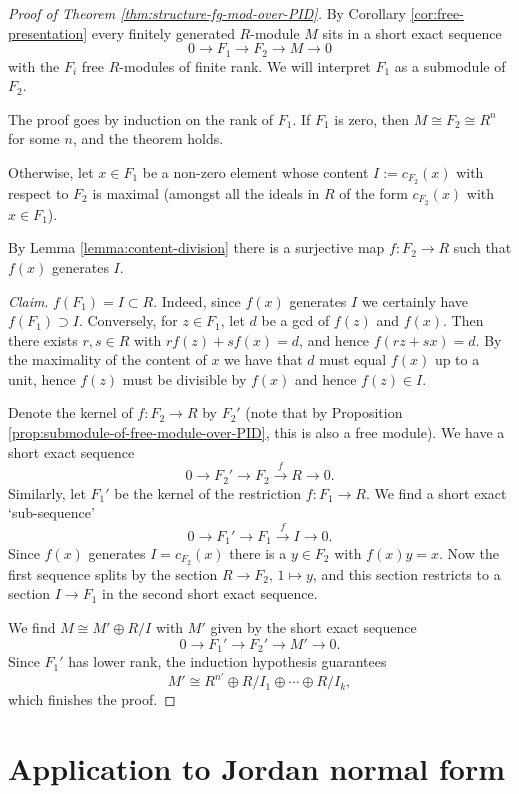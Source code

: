 \documentclass[11pt]{amsbook}
\newcommand{\longto}{\longrightarrow}
\theoremstyle{plain}
\theoremstyle{definition}
\begin{document}
\begin{proof}[Proof of Theorem \ref{thm:structure-fg-mod-over-PID}]
By Corollary \ref{cor:free-presentation} every finitely generated $R$-module $M$ sits in a short exact sequence
\[
	0 \longto F_1 \longto F_2 \longto M \longto 0
\]
with the $F_i$ free $R$-modules of finite rank. We will interpret $F_1$ as a submodule of $F_2$.

The proof goes by induction on the rank of $F_1$. If $F_1$ is zero, then $M\cong F_2\cong R^n$ for some $n$, and the theorem holds.

Otherwise, let  $x\in F_1$  be a non-zero element whose content $I := c_{F_2}(x)$ with respect to $F_2$ is maximal (amongst all the ideals in $R$ of the form $c_{F_2}(x)$ with $x\in F_1$). 

By Lemma \ref{lemma:content-division} there is a surjective map $f\colon F_2 \to R$ such that $f(x)$ generates $I$. 

\emph{Claim}. $f(F_1) = I \subset R$. Indeed, since $f(x)$ generates $I$ we certainly have $f(F_1)\supset I$. Conversely, for $z\in F_1$, let $d$ be a gcd of $f(z)$ and $f(x)$. Then there exists $r, s\in R$ with $rf(z)+sf(x)=d$, and hence $f(rz+sx)=d$. By the maximality of the content of $x$ we have that $d$ must equal $f(x)$ up to a unit, hence $f(z)$ must be divisible by $f(x)$ and hence $f(z)\in I$.

Denote the kernel of $f\colon F_2 \to R$ by $F_2'$ (note that by Proposition \ref{prop:submodule-of-free-module-over-PID}, this is also a free module). We have a short exact sequence
\[
	0 \longto F_2' \longto F_2 \overset{f}\longto R \longto 0.
\]
Similarly, let $F_1'$ be the kernel of the restriction $f\colon F_1 \to R$. We find a short exact `sub-sequence'
\[
	0 \longto F_1' \longto F_1 \overset{f}\longto I \longto 0.
\]
Since $f(x)$ generates $I = c_{F_2}(x)$ there is a $y\in F_2$ with $f(x)y = x$. Now 
the first sequence splits by the section $R\to F_2,\, 1\mapsto y$, and this section restricts to a section
$I\to F_1$ in the second short exact sequence.

We find $M\cong M' \oplus R/I$ with $M'$ given by the short exact sequence
\[
	0 \longto F_1' \longto F_2' \longto M' \longto 0.
\]
Since $F_1'$ has lower rank, the induction hypothesis guarantees
\[
	M' \cong R^{n'} \oplus R/I_1 \oplus \cdots \oplus R/I_k,
\]
which finishes the proof.
\end{proof}


\section{Application to Jordan normal form}
\end{document}
